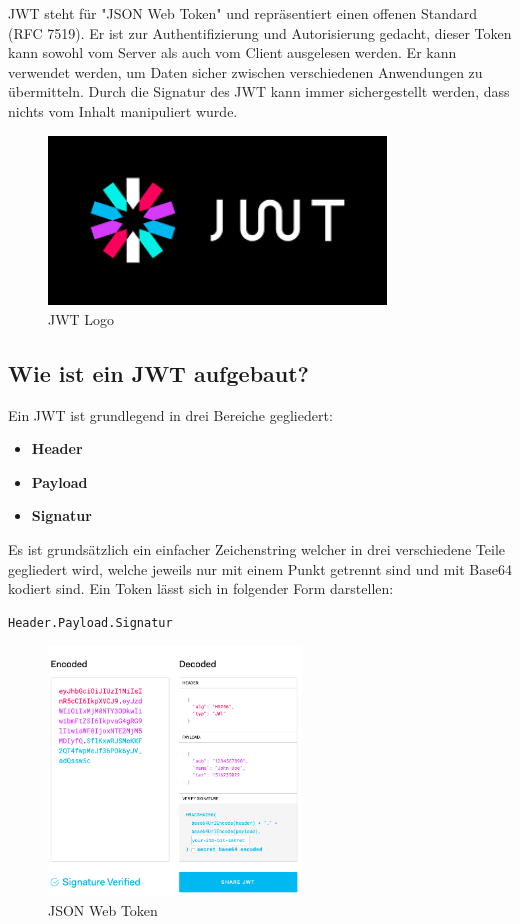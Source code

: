 JWT steht für "JSON Web Token" und repräsentiert einen offenen Standard (RFC 7519). Er ist zur Authentifizierung und Autorisierung gedacht, dieser Token kann sowohl vom Server als auch vom Client ausgelesen werden. Er kann verwendet werden, um Daten sicher zwischen verschiedenen Anwendungen zu übermitteln. Durch die Signatur des JWT kann immer sichergestellt werden, dass nichts vom Inhalt manipuliert wurde. \cite{JWT_1}

\begin{figure}[h]
    \centering
    \includegraphics[width=0.8\textwidth]{pics/jwt-logo.png}
    \caption{JWT Logo}
\end{figure}


\subsection{Wie ist ein JWT aufgebaut?}
Ein JWT ist grundlegend in drei Bereiche gegliedert:

\begin{itemize}
\item \textbf{Header}
\item \textbf{Payload}
\item \textbf{Signatur}
\end{itemize}

Es ist grundsätzlich ein einfacher Zeichenstring welcher in drei verschiedene Teile gegliedert wird, welche jeweils nur mit einem Punkt getrennt sind und mit Base64 kodiert sind. Ein Token lässt sich in folgender Form darstellen:

\begin{lstlisting}
Header.Payload.Signatur
\end{lstlisting}


\begin{figure}[h!]
    \centering
    \includegraphics[width=0.6\textwidth]{pics/jwt.png}
    \caption{JSON Web Token}
    \label{fig:enter-label}
\end{figure}

